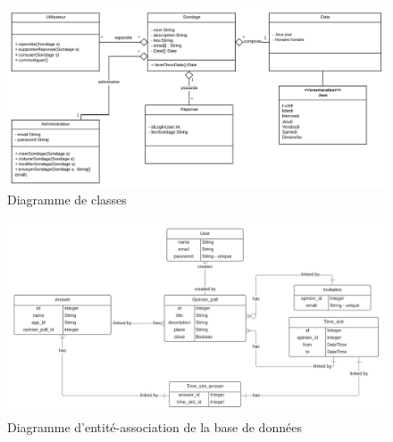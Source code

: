 \documentclass[titlepage]{report}
\begin{document}
\begin{figure}[h]
	\caption{Diagramme de classes}
	\label{annexe_diagramme_classes}
	\centering
	\includegraphics[width=\textwidth]{figures/diagrammes/classes.png}
\end{figure}

\begin{figure}[h]
	\caption{Diagramme d'entité-association de la base de données}
	\label{annexe_diagramme_entiteAssociation}
	\centering
	\includegraphics[width=\textwidth]{figures/diagrammes/entiteAssociation.png}
\end{figure}
\end{document}
